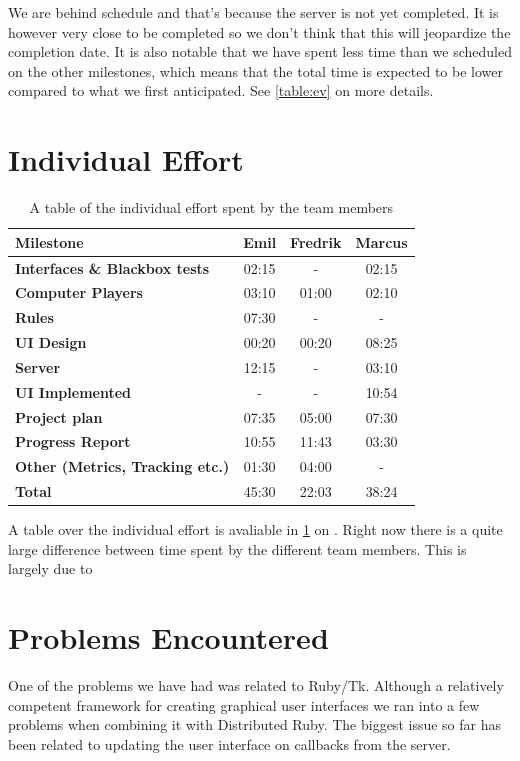 \documentclass[10pt, titlepage, oneside, a4paper]{article}
\begin{document}
	We are behind schedule and that's because the server is not yet completed. It is however very close to be completed so we don't think that this will jeopardize the completion date. It is also notable that we have spent less time than we scheduled on the other milestones, which means that the total time is expected to be lower compared to what we first anticipated. See \tablename{} \ref{table:ev} on \pagename{} \pageref{table:ev} more details.
	
	\section{Individual Effort}

	\begin{table}
		\centering
	\begin{tabular}{l ccc}
		\textbf{Milestone}		
			& \textbf{Emil} 	& \textbf{Fredrik} 	& \textbf{Marcus} \\
		\hline
		\textbf{Interfaces \& Blackbox tests}
			& 02:15 & - & 02:15 \\
		\textbf{Computer Players}   
			& 03:10 & 01:00 & 02:10 \\
		\textbf{Rules}  
			& 07:30 & - & - \\
		\textbf{UI Design}  
			& 00:20 & 00:20 & 08:25 \\
		\textbf{Server}   
			& 12:15 & - & 03:10 \\
		\textbf{UI Implemented}   
			& - & - & 10:54 \\
		\hline   
		\textbf{Project plan}   
			& 07:35 & 05:00 & 07:30 \\
		\textbf{Progress Report}   
			& 10:55 & 11:43 & 03:30 \\
		\hline
		\textbf{Other (Metrics, Tracking etc.)}
			& 01:30 & 04:00 & - \\
		\hline
		\hline
		\textbf{Total}   
			& 45:30 & 22:03 & 38:24 \\
		\hline
		\hline
	\end{tabular}
		\caption{A table of the individual effort spent by the team members}
		\label{tab:effort}
	\end{table}

	A table over the individual effort is avaliable in \tablename{} \ref{tab:effort} on \pagename{} \pageref{tab:effort}. Right now there is a quite large difference between time spent by the different team members. This is largely due to 

	\section{Problems Encountered}
	One of the problems we have had was related to Ruby/Tk. Although a relatively competent framework for creating graphical user interfaces we ran into a few problems when combining it with Distributed Ruby. The biggest issue so far has been related to updating the user interface on callbacks from the server.
	
\end{document}
